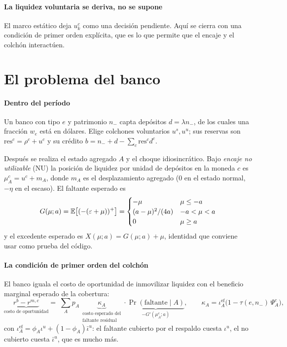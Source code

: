 \paragraph{La liquidez voluntaria se deriva, no se supone} El marco estático deja
$u^c_k$ como una decisión pendiente. Aquí se cierra con una condición de primer
orden explícita, que es lo que permite que el encaje y el colchón interactúen.

\section{El problema del banco}

\paragraph{Dentro del período} Un banco con tipo $e$ y patrimonio $n_-$ capta
depósitos $d=\lambda n_-$, de los cuales una fracción $w_e$ está en dólares.
Elige colchones voluntarios $u^s, u^u$; sus reservas son $\mathrm{res}^c=\rho^c+u^c$
y su crédito $b = n_- + d - \sum_c \mathrm{res}^c d^c$.

Después se realiza el estado agregado $A$ y el choque idiosincrático. Bajo
\emph{encaje no utilizable} (NU) la posición de liquidez por unidad de depósitos
en la moneda $c$ es $\mu^c_A = u^c + m_A$, donde $m_A$ es el desplazamiento
agregado ($0$ en el estado normal, $-\eta$ en el escaso). El faltante esperado es
\begin{equation}
G(\mu;a) = \mathbb{E}\big[(-(\varepsilon+\mu))^+\big]
= \begin{cases}
-\mu & \mu\le-a\\
(a-\mu)^2/(4a) & -a<\mu<a\\
0 & \mu\ge a
\end{cases}
\label{eq:G}
\end{equation}
y el excedente esperado es $X(\mu;a)=G(\mu;a)+\mu$, identidad que conviene usar
como prueba del código.

\paragraph{La condición de primer orden del colchón} El banco iguala el costo de
oportunidad de inmovilizar liquidez con el beneficio marginal esperado de la
cobertura:
\begin{equation}
\underbrace{r^b - r^{m,c}}_{\text{costo de oportunidad}}
=\;
\sum_A p_A\,\underbrace{\kappa_A}_{\substack{\text{costo esperado del}\\\text{faltante residual}}}
\cdot\underbrace{\Pr(\text{faltante}\mid A)}_{-G'(\mu^c_A;a)},
\qquad
\kappa_A = \iota^{\text{ef}}_A\big(1-\tau(e,n_-)\,\Psi^c_A\big),
\label{eq:cpo}
\end{equation}
con $\iota^{\text{ef}}_A = \phi_A\iota^u + (1-\phi_A)\bar\iota^u$: el faltante
cubierto por el respaldo cuesta $\iota^u$, el no cubierto cuesta $\bar\iota^u$,
que es mucho más.

